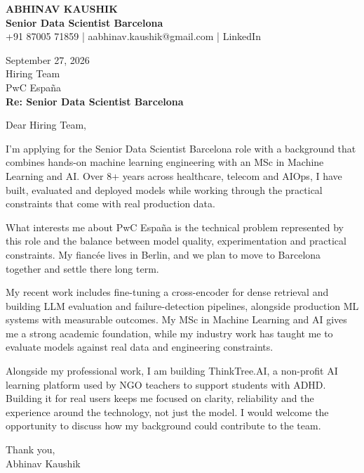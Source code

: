 \documentclass[10pt,a4paper]{article}
\begin{document}
\begin{center}
{\Large\bfseries ABHINAV KAUSHIK}\\[2pt]
{\bfseries Senior Data Scientist Barcelona}\\[2pt]
+91 87005 71859 \quad | \quad aabhinav.kaushik@gmail.com \quad | \quad LinkedIn
\end{center}
\vspace{8pt}
September 27, 2026\\[6pt]
Hiring Team\\
PwC España\\[4pt]
\textbf{Re: Senior Data Scientist Barcelona}

Dear Hiring Team,

I’m applying for the Senior Data Scientist Barcelona role with a background that combines hands-on machine learning engineering with an MSc in Machine Learning and AI. Over 8+ years across healthcare, telecom and AIOps, I have built, evaluated and deployed models while working through the practical constraints that come with real production data.

What interests me about PwC España is the technical problem represented by this role and the balance between model quality, experimentation and practical constraints. My fiancée lives in Berlin, and we plan to move to Barcelona together and settle there long term.

My recent work includes fine-tuning a cross-encoder for dense retrieval and building LLM evaluation and failure-detection pipelines, alongside production ML systems with measurable outcomes. My MSc in Machine Learning and AI gives me a strong academic foundation, while my industry work has taught me to evaluate models against real data and engineering constraints.

Alongside my professional work, I am building ThinkTree.AI, a non-profit AI learning platform used by NGO teachers to support students with ADHD. Building it for real users keeps me focused on clarity, reliability and the experience around the technology, not just the model. I would welcome the opportunity to discuss how my background could contribute to the team.

Thank you,\\
Abhinav Kaushik
\end{document}
